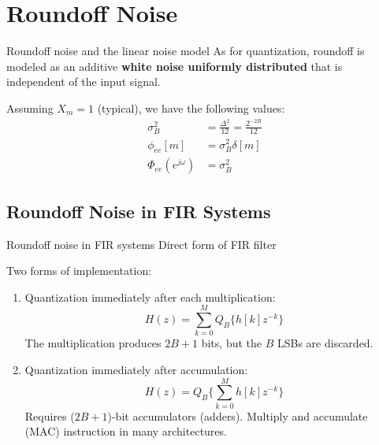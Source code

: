 \documentclass[10pt]{beamer}
\begin{document}
%
\section{Roundoff Noise}
\begin{frame}{Roundoff noise and the linear noise model}
As for quantization, roundoff is modeled as an additive \textbf{white noise uniformly distributed} that is independent of the input signal. 

\begin{center}
\resizebox{0.6\textwidth}{!}{}
\end{center}

Assuming $X_m = 1$ (typical), we have the following values:
\begin{align*}
\sigma_B^2 &= \frac{\Delta^2}{12} =  \frac{2^{-2B}}{12}\tag{average power} \\
\phi_{ee}[m] &= \sigma_B^2\delta[m] \tag{autocorrelation function} \\
\Phi_{ee}(e^{j\omega}) &= \sigma_B^2 \tag{PSD}
\end{align*}
\end{frame}

\subsection{Roundoff Noise in FIR Systems}
\begin{frame}{Roundoff noise in FIR systems}
	Direct form of FIR filter
	\begin{center}
		\resizebox{0.75\textwidth}{!}{}
	\end{center}
	\vspace{-0.4cm}
	Two forms of implementation:
	\begin{enumerate}
		\item Quantization immediately after each multiplication:
		\begin{equation*}
		H(z) = \sum_{k = 0}^M Q_B\{h[k]z^{-k}\}
		\end{equation*}
		The multiplication produces $2B+1$ bits, but the $B$ LSBs are discarded.
		\item Quantization immediately after accumulation:
		\begin{equation*}
		H(z) = Q_B\bigg\lbrace\sum_{k = 0}^M h[k]z^{-k}\bigg\rbrace
		\end{equation*}
		Requires ($2B+1$)-bit accumulators (adders). Multiply and accumulate (MAC) instruction in many architectures.
	\end{enumerate}	
\end{frame}
\end{document}
